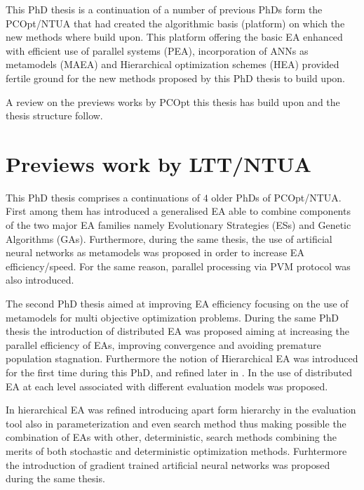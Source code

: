 This PhD thesis is a continuation of a number of previous PhDs \cite{phd_Giotis,phd_Karakasis,phd_Kampolis,phd_Vera} form the PCOpt/NTUA that had created the algorithmic basis (platform) on which the new methods where build upon. This platform offering the basic EA enhanced with efficient use of parallel systems (PEA), incorporation of ANNs as metamodels (MAEA) and Hierarchical optimization schemes (HEA) provided fertile ground for the new methods proposed by this PhD thesis to build upon.                       
 
A review on the previews works by PCOpt this thesis has build upon and the thesis structure follow.

\section{Previews work by LTT/NTUA} %
This PhD thesis comprises a continuations of $4$ older PhDs of PCOpt/NTUA. First among them \cite{phd_Giotis} has introduced a generalised EA able to combine components of the two major EA families namely Evolutionary Strategies (ESs) and Genetic Algorithms (GAs). Furthermore, during the same thesis, the use of artificial neural networks as metamodels was proposed in order to increase EA efficiency/speed. For the same reason, parallel processing via PVM protocol was also introduced. 

The second PhD thesis \cite{phd_Karakasis} aimed at improving EA efficiency focusing on the use of metamodels for multi objective optimization problems. During the same PhD thesis the introduction of distributed EA was proposed aiming at increasing the parallel efficiency of EAs, improving convergence and avoiding premature population stagnation. Furthermore the notion of Hierarchical EA was introduced for the first time during this PhD, and refined later in \cite{phd_Kampolis}.    In \cite{phd_Karakasis} the use of distributed EA at each level associated with different evaluation models was proposed.

In \cite{phd_Kampolis} hierarchical EA was refined introducing apart form    hierarchy in the evaluation tool also in parameterization and even search method thus making possible the combination of EAs with other, deterministic, search methods combining the merits of both stochastic and deterministic optimization methods. Furhtermore the introduction of gradient trained artificial neural networks was proposed during the same thesis.          

